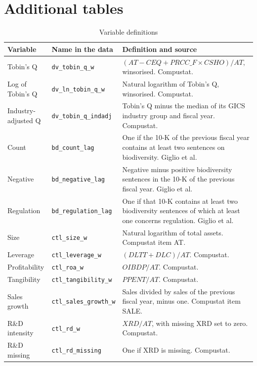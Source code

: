 \documentclass[12pt,a4paper]{article}
\begin{document}
\appendix
\renewcommand{\thetable}{A\arabic{table}}
\setcounter{table}{0}
\section{Additional tables}

\begin{table}[!htbp]
\centering\small
\caption{Variable definitions}\label{tab:variables}
\begin{tabularx}{\linewidth}{@{}>{\raggedright\arraybackslash}p{3.3cm}>{\raggedright\arraybackslash}p{3.6cm}>{\raggedright\arraybackslash}X@{}}
\toprule
Variable & Name in the data & Definition and source \\
\midrule
Tobin's Q & \texttt{dv\_tobin\_q\_w} & $(AT - CEQ + PRCC\_F \times CSHO) / AT$, winsorised. Compustat. \\
Log of Tobin's Q & \texttt{dv\_ln\_tobin\_q\_w} & Natural logarithm of Tobin's Q, winsorised. Compustat. \\
Industry-adjusted Q & \texttt{dv\_tobin\_q\_indadj} & Tobin's Q minus the median of its GICS industry group and fiscal year. Compustat. \\
Count & \texttt{bd\_count\_lag} & One if the 10-K of the previous fiscal year contains at least two sentences on biodiversity. Giglio et al. \\
Negative & \texttt{bd\_negative\_lag} & Negative minus positive biodiversity sentences in the 10-K of the previous fiscal year. Giglio et al. \\
Regulation & \texttt{bd\_regulation\_lag} & One if that 10-K contains at least two biodiversity sentences of which at least one concerns regulation. Giglio et al. \\
Size & \texttt{ctl\_size\_w} & Natural logarithm of total assets. Compustat item AT. \\
Leverage & \texttt{ctl\_leverage\_w} & $(DLTT + DLC) / AT$. Compustat. \\
Profitability & \texttt{ctl\_roa\_w} & $OIBDP / AT$. Compustat. \\
Tangibility & \texttt{ctl\_tangibility\_w} & $PPENT / AT$. Compustat. \\
Sales growth & \texttt{ctl\_sales\_growth\_w} & Sales divided by sales of the previous fiscal year, minus one. Compustat item SALE. \\
R\&D intensity & \texttt{ctl\_rd\_w} & $XRD / AT$, with missing XRD set to zero. Compustat. \\
R\&D missing & \texttt{ctl\_rd\_missing} & One if XRD is missing. Compustat. \\

\end{tabularx}
\end{table}
\end{document}
